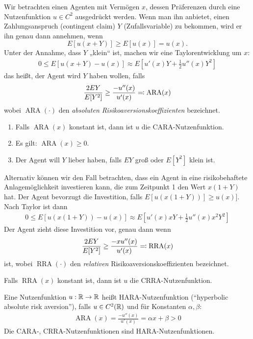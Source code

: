 \documentclass[a4paper,twoside,DIV15,BCOR12mm]{scrbook}
\DeclareMathOperator{\ARA}{ARA}
\DeclareMathOperator{\RRA}{RRA}
\begin{document}
Wir betrachten einen Agenten mit Vermögen $x$, dessen Präferenzen durch eine Nutzenfunktion $u\in C^2$ ausgedrückt werden. Wenn man ihn anbietet, einen Zahlungsanspruch (contingent claim) $Y$ (Zufallsvariable) zu bekommen, wird er ihn genau dann annehmen, wenn \[E[u(x+Y)] \ge E[u(x)] = u(x).\]
Unter der Annahme, dass $Y$ „klein“ ist, machen wir eine Taylorentwicklung um $x$:
\begin{align*}
0\le E[u(x+Y) - u(x)] \approx E[u'(x)Y+ \frac12 u''(x)Y^2]
\end{align*}
das heißt, der Agent wird $Y$ haben wollen, falls 
\begin{align*}
\frac{2EY}{E[Y^2]} \ge \frac{-u''(x)}{u'(x)} \ad \ARA(x)
\end{align*}
wobei $\ARA(\cdot)$ den \emph{absoluten Risikoaversionskoeffizienten} bezeichnet.

\begin{bemerkung}
\begin{enumerate}
\item Falls $\ARA(x)$ konstant ist, dann ist $u$ die CARA-Nutzenfunktion.
\item Es gilt: $\ARA(x) \ge 0$.
\item Der Agent will $Y$ lieber haben, falls $EY$ groß oder $E[Y^2]$ klein ist.
\end{enumerate}
\end{bemerkung}

Alternativ können wir den Fall betrachten, dass ein Agent in eine risikobehaftete Anlagemöglichkeit investieren kann, die zum Zeitpunkt 1 den Wert $x(1+Y)$ hat. Der Agent bevorzugt die Investition, falls $E[u(x(1+Y))] \ge u(x)]$. Nach Taylor ist dann
\begin{align*}
0 \le E[u(x(1+Y)) - u(x)] \approx E[u'(x)xY + \frac12 u''(x) x^2 Y^2]
\end{align*}
Der Agent zieht diese Investition vor, genau dann wenn
\[\frac{2EY}{E[Y^2]}\ge \frac {-xu''(x)}{u'(x)} \ad \RRA(x)\]
ist, wobei $\RRA(\cdot)$ den \emph{relativen} Risikoaversionskoeffizienten  bezeichnet.

\begin{bemerkung}
Falls $\RRA(x)$ konstant ist, dann ist $u$ die CRRA-Nutzenfunktion.
\end{bemerkung}

\begin{definition}
Eine Nutzenfunktion $u:\mathbb{R}\to\mathbb{R}$ heißt HARA-Nutzenfunktion (“hyperbolic absolute risk aversion”), falls $u\in C^2(\mathbb{R})$ und für Konstanten $\alpha, \beta$:
\begin{align*}
\ARA(x) = \frac{-u''(x)}{u'(x)} = \alpha x + \beta > 0
\end{align*}
Die CARA-, CRRA-Nutzenfunktionen sind HARA-Nutzenfunktionen.
\end{definition}
\end{document}
